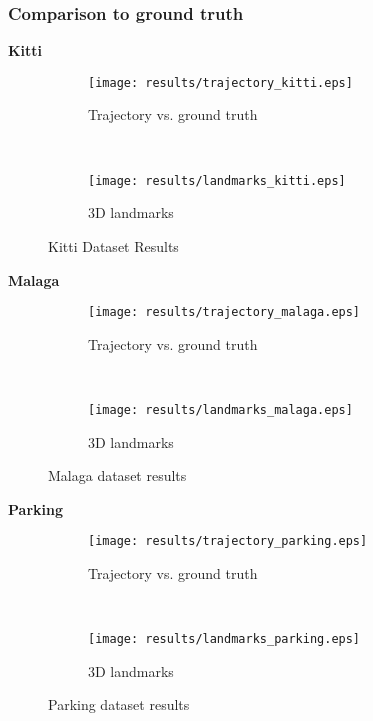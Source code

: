 \subsubsection{Comparison to ground truth}
\textbf{Kitti}
\begin{figure*}[ht!]
    \centering
    \begin{subfigure}[t]{0.5\textwidth}
        \centering
        \texttt{[image: results/trajectory\_kitti.eps]}
        \caption{Trajectory vs. ground truth}
    \end{subfigure}%
    ~ 
    \begin{subfigure}[t]{0.5\textwidth}
        \centering
        \texttt{[image: results/landmarks\_kitti.eps]}
        \caption{3D landmarks}
    \end{subfigure}
    \caption{Kitti Dataset Results}
		\label{parking_result_fig}
\end{figure*}

\newpage

\textbf{Malaga}
\begin{figure*}[ht!]
    \centering
    \begin{subfigure}[t]{0.5\textwidth}
        \centering
        \texttt{[image: results/trajectory\_malaga.eps]}
        \caption{Trajectory vs. ground truth}
    \end{subfigure}%
    ~ 
    \begin{subfigure}[t]{0.5\textwidth}
        \centering
        \texttt{[image: results/landmarks\_malaga.eps]}
        \caption{3D landmarks}
    \end{subfigure}
    \caption{Malaga dataset results}
		\label{parking_result_fig}
\end{figure*}

\textbf{Parking}
\begin{figure*}[ht!]
    \centering
    \begin{subfigure}[t]{0.5\textwidth}
        \centering
        \texttt{[image: results/trajectory\_parking.eps]}
        \caption{Trajectory vs. ground truth}
    \end{subfigure}%
    ~ 
    \begin{subfigure}[t]{0.5\textwidth}
        \centering
        \texttt{[image: results/landmarks\_parking.eps]}
        \caption{3D landmarks}
    \end{subfigure}
    \caption{Parking dataset results}
		\label{parking_result_fig}
\end{figure*}
\newpage


